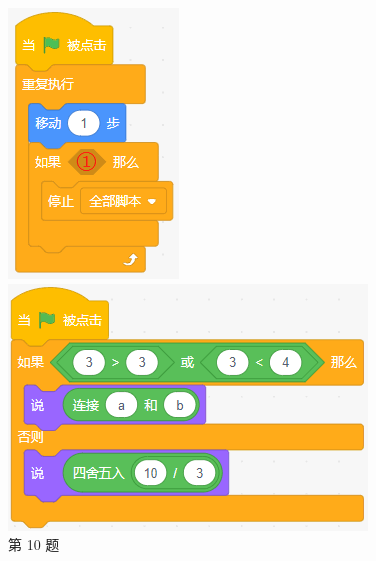 \documentclass[10pt, a4paper]{article}
\begin{document}
\begin{enumerate}
\begin{figure}[htbp]
\begin{minipage}[t]{.28\textwidth}
\begin{minipage}[t]{.4\textwidth}
                    \includegraphics[width=\textwidth]{figure/10-2.png}
                \end{minipage}
                \caption*{第 10 题}
            \end{minipage}
            \begin{minipage}[t]{.26\textwidth}
                \centering
                \includegraphics[width=\textwidth]{figure/11.png}

\end{minipage}
\end{figure}
\end{enumerate}
\end{document}
